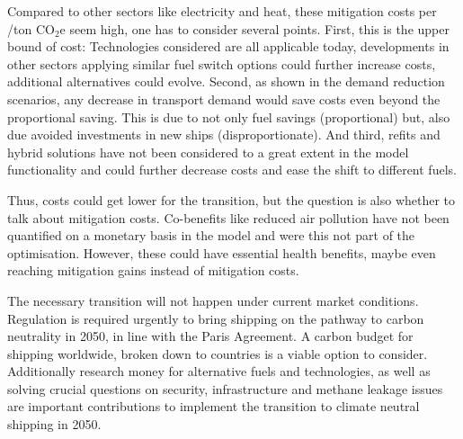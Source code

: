 \documentclass[article]{elsarticle}
\begin{document}
Compared to other sectors like electricity and heat, these mitigation costs per /ton CO$_2$e seem high, one has to consider several points. First, this is the upper bound of cost: Technologies considered are all applicable today, developments in other sectors applying similar fuel switch options could further increase costs, additional alternatives could evolve. Second, as shown in the demand reduction scenarios, any decrease in transport demand would save costs even beyond the proportional saving. This is due to not only fuel savings (proportional) but, also due avoided investments in new ships (disproportionate). And third, refits and hybrid solutions have not been considered to a great extent in the model functionality and could further decrease costs and ease the shift to different fuels.


Thus, costs could get lower for the transition, but the question is also whether to talk about mitigation costs. Co-benefits like reduced air pollution have not been quantified on a monetary basis in the model and were this not part of the optimisation. However, these could have essential health benefits, maybe even reaching mitigation gains instead of mitigation costs.

The necessary transition will not happen under current market conditions. Regulation is required urgently to bring shipping on the pathway to carbon neutrality in 2050, in line with the Paris Agreement. A carbon budget for shipping worldwide, broken down to countries is a viable option to consider. Additionally research money for alternative fuels and technologies, as well as solving crucial questions on security, infrastructure and methane leakage issues are important contributions to implement the transition to climate neutral shipping in 2050. 

\end{document}
